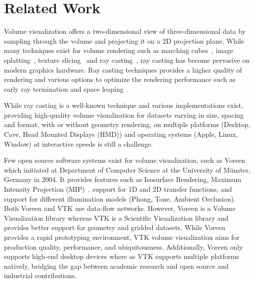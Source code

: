 \section{Related Work}
\label{relatedwork}

Volume visualization offers a two-dimensional view of three-dimensional data by
sampling through the volume and projecting it on a 2D projection plane.  While
many techniques exist for volume rendering such as marching
cubes~\citep{lorensen_marching_1987}, image
splatting~\citep{westover_footprint_1990}, texture
slicing~\citep{rezk-salama_interactive_2000, engel_high-quality_2001} and ray
casting~\citep{hsu_segmented_1993, ma_parallel_1995, ma_scalable_1997,
heng_gpu-based_2005}, ray casting has become pervasive on modern
graphics hardware. Ray casting techniques provides a higher quality of rendering
and various options to optimize the rendering performance such as early ray
termination and space leaping~\citep{yagel_accelerating_1993}.

While ray casting is a well-known technique and various implementations exist,
providing high-quality volume visualization for datasets
varying in size, spacing and format, with or without geometry rendering, on
multiple platforms (Desktop, Cave, Head Mounted Displays (HMD)) and operating
systems (Apple, Linux, Window) at interactive speeds is still a challenge.

Few open source software systems exist for volume visualization, such as
Voreen~\citep{meyer-spradow_voreen:_2009} which initiated at Department of
Computer Science at the University of M\"unster, Germany in 2004.  It provides
features such as Isosurface Rendering, Maximum Intensity Projection
(MIP)~\citep{wallis_three-dimensional_1989}, support for 1D and 2D transfer
functions, and support for different illumination models (Phong, Tone, Ambient
Occlusion). Both Voreen and VTK use data-flow networks. However, Voreen is a
Volume Visualization library whereas VTK is a Scientific Visualization library
and provides better support for geometry and gridded datasets. While Voreen
provides a rapid prototyping environment, VTK volume visualization aims for
production quality, performance, and ubiquitousness. Additionally, Voreen only
supports high-end desktop devices where as VTK supports multiple platforms
natively, bridging the gap between academic research and open source and
industrial contributions.

